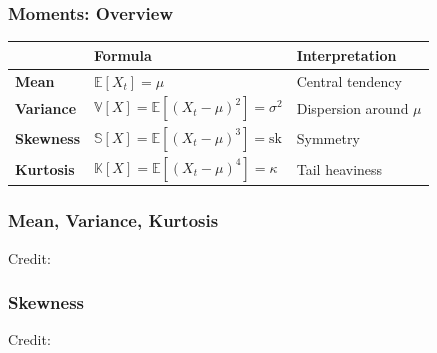 \documentclass{beamer}
\begin{document}
\begin{frame}
  \frametitle{Moments: Overview}
  \begin{table}
    \centering
    \begin{tabular}{lll}
      \hline
      \hline
      & Formula & Interpretation \\
      \hline
      \textbf{Mean} & $\mathbb{E}[X_t] = \mu$ & Central tendency\\
      \textbf{Variance} & $\mathbb{V}[X] = \mathbb{E}\left[(X_t - \mu)^2\right] = \sigma^2$ & Dispersion around $\mu$\\
      \textbf{Skewness} & $\mathbb{S}[X] = \mathbb{E}\left[(X_t - \mu)^3\right] = \text{sk}$ & Symmetry\\
      \textbf{Kurtosis} & $\mathbb{K}[X] = \mathbb{E}\left[(X_t - \mu)^4\right] = \kappa$ & Tail heaviness\\
      \hline
      \hline                                                                                            
    \end{tabular}
  \end{table}
\end{frame}


\begin{frame}
  \frametitle{Mean, Variance, Kurtosis}
  \hspace*{15pt}\hbox{\scriptsize Credit:}
\end{frame}



\begin{frame}
  \frametitle{Skewness}
  \hspace*{15pt}\hbox{\scriptsize Credit:}
\end{frame}
\end{document}
